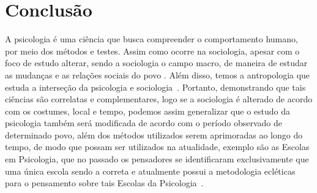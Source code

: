 \section{Conclusão}\label{conclusao}


A psicologia é uma ciência que busca compreender o comportamento humano, por meio dos métodos e testes.
Assim como ocorre na sociologia, apesar com o foco de estudo alterar, sendo a sociologia o campo macro, de maneira de estudar as mudanças e as relações sociais do povo \cite{quintaneiro2003toque}.
Além disso, temos a antropologia que estuda a interseção da psicologia e sociologia~\cite{castro2016antropologia}.
Portanto, demonstrando que tais ciências são correlatas e complementares, logo se a sociologia é alterado de acordo com os costumes, local e tempo, podemos assim generalizar que o estudo da psicologia também será modificada de acordo com o período observado de determinado povo, além dos métodos utilizados serem aprimoradas ao longo do tempo, de modo que possam ser utilizados na atualidade, exemplo são as Escolas em Psicologia, que no passado os pensadores se identificaram exclusivamente que uma única escola sendo a correta e atualmente possui a metodologia ecléticas para o pensamento sobre tais Escolas da Psicologia~\cite{spink2011psicologia_social}.
